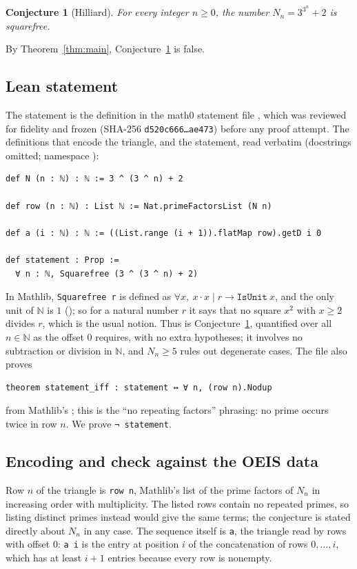 \documentclass[11pt]{amsart}
\theoremstyle{plain}
\newtheorem{conjecture}[theorem]{Conjecture}
\theoremstyle{definition}
\newcommand{\N}{\mathbb{N}}
\begin{document}
\begin{conjecture}[Hilliard]\label{conj}
For every integer $n\ge0$, the number $N_n=3^{3^n}+2$ is squarefree.
\end{conjecture}

By Theorem~\ref{thm:main}, Conjecture~\ref{conj} is false.

\subsection*{Lean statement}
The statement is the definition  in the math0 statement file , which was reviewed for fidelity and frozen (SHA-256 \texttt{d520c666\ldots ae473}) before any proof attempt.
The definitions that encode the triangle, and the statement, read verbatim (docstrings omitted; namespace ):
\begin{lstlisting}
def N (n : ℕ) : ℕ := 3 ^ (3 ^ n) + 2

def row (n : ℕ) : List ℕ := Nat.primeFactorsList (N n)

def a (i : ℕ) : ℕ := ((List.range (i + 1)).flatMap row).getD i 0

def statement : Prop :=
  ∀ n : ℕ, Squarefree (3 ^ (3 ^ n) + 2)
\end{lstlisting}
In Mathlib, \texttt{Squarefree r} is defined as $\forall x,\ x\cdot x\mid r\to\texttt{IsUnit}\ x$, and the only unit of $\N$ is $1$ (); so for a natural number $r$ it says that no square $x^2$ with $x\ge2$ divides $r$, which is the usual notion.
Thus  is Conjecture~\ref{conj}, quantified over all $n\in\N$ as the offset $0$ requires, with no extra hypotheses; it involves no subtraction or division in $\N$, and $N_n\ge5$ rules out degenerate cases.
The file also proves
\begin{lstlisting}
theorem statement_iff : statement ↔ ∀ n, (row n).Nodup
\end{lstlisting}
from Mathlib's ; this is the ``no repeating factors'' phrasing: no prime occurs twice in row $n$.
We prove \texttt{¬ statement}.

\subsection*{Encoding and check against the OEIS data}
Row $n$ of the triangle is \texttt{row n}, Mathlib's list of the prime factors of $N_n$ in increasing order with multiplicity. The listed rows contain no repeated primes, so listing distinct primes instead would give the same terms; the conjecture is stated directly about $N_n$ in any case.
The sequence itself is \texttt{a}, the triangle read by rows with offset $0$: \texttt{a i} is the entry at position $i$ of the concatenation of rows $0,\dots,i$, which has at least $i+1$ entries because every row is nonempty.
\end{document}
